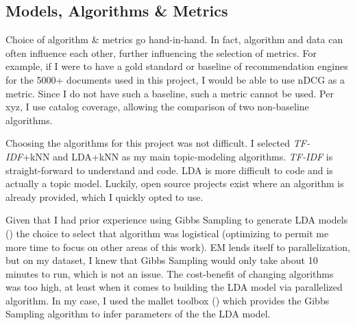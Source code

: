 \subsection{Models, Algorithms \& Metrics}
Choice of algorithm \& metrics go hand-in-hand. In fact, algorithm and data can often influence each other, further influencing the selection of metrics. For example, if I were to have a gold standard or baseline of recommendation engines for the 5000+ documents used in this project, I would be able to use nDCG as a metric. Since I do not have such a baseline, such a metric cannot be used. Per xyz, I use catalog coverage, allowing the comparison of two non-baseline algorithms.

Choosing the algorithms for this project was not difficult. I selected \emph{TF-IDF}+kNN and LDA+kNN as my main topic-modeling algorithms. \emph{TF-IDF} is straight-forward to understand and code. LDA is more difficult to code and is actually a topic model. Luckily, open source projects exist where an algorithm is already provided, which I quickly opted to use.

Given that I had prior experience using Gibbs Sampling to generate LDA models (\citealp{bean5-LDA-ToT}) the choice to select that algorithm was logistical (optimizing to permit me more time to focus on other areas of this work). EM lends itself to parallelization, but on my dataset, I knew that Gibbs Sampling would only take about 10 minutes to run, which is not an issue. The cost-benefit of changing algorithms was too high, at least when it comes to building the LDA model via parallelized algorithm. In my case, I used the mallet toolbox (\citealp{McCallumMALLET, cite_in_intro}) which provides the Gibbs Sampling algorithm to infer parameters of the the LDA model.

